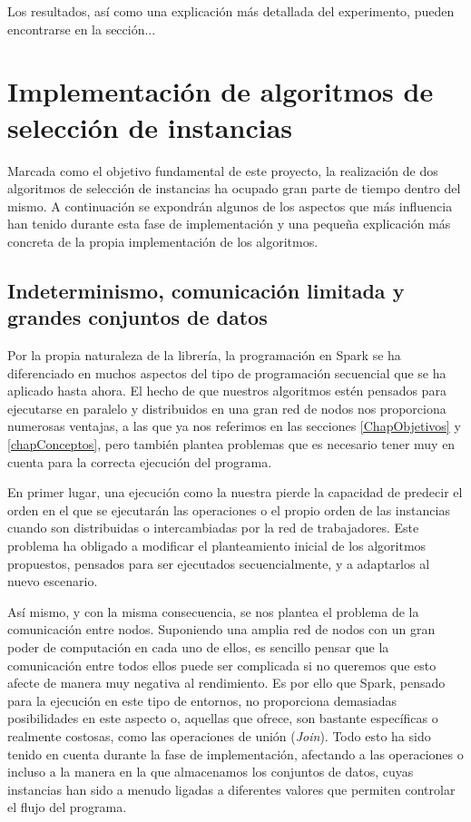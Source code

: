 Los resultados, así como una explicación más detallada del experimento, pueden encontrarse en la sección...




\section{Implementación de algoritmos de selección de instancias}

Marcada como el objetivo fundamental de este proyecto, la realización de dos algoritmos de selección de instancias ha ocupado gran parte de tiempo dentro del mismo. A continuación se expondrán algunos de los aspectos que más influencia han tenido durante esta fase de implementación y una pequeña explicación más concreta de la propia implementación de los algoritmos.


\subsection{Indeterminismo, comunicación limitada y grandes conjuntos de datos}

Por la propia naturaleza de la librería, la programación en Spark se ha diferenciado en muchos aspectos del tipo de programación secuencial que se ha aplicado hasta ahora. El hecho de que nuestros algoritmos estén pensados para ejecutarse en paralelo y distribuidos en una gran red de nodos nos proporciona numerosas ventajas, a las que ya nos referimos en las secciones \ref{ChapObjetivos} y \ref{chapConceptos}, pero también plantea problemas que es necesario tener muy en cuenta para la correcta ejecución del programa.

En primer lugar, una ejecución como la nuestra pierde la capacidad de predecir el orden en el que se ejecutarán las operaciones o el propio orden de las instancias cuando son distribuidas o intercambiadas por la red de trabajadores. Este problema ha obligado a modificar el planteamiento inicial de los algoritmos propuestos, pensados para ser ejecutados secuencialmente, y a adaptarlos al nuevo escenario.

Así mismo, y con la misma consecuencia, se nos plantea el problema de la comunicación entre nodos. Suponiendo una amplia red de nodos con un gran poder de computación en cada uno de ellos, es sencillo pensar que la comunicación entre todos ellos puede ser complicada si no queremos que esto afecte de manera muy negativa al rendimiento. Es por ello que Spark, pensado para la ejecución en este tipo de entornos, no proporciona demasiadas posibilidades en este aspecto o, aquellas que ofrece, son bastante específicas o realmente costosas, como las operaciones de unión (\textit{Join}). Todo esto ha sido tenido en cuenta durante la fase de implementación, afectando a las operaciones o incluso a la manera en la que almacenamos los conjuntos de datos, cuyas instancias han sido a menudo ligadas a diferentes valores que permiten controlar el flujo del programa.

